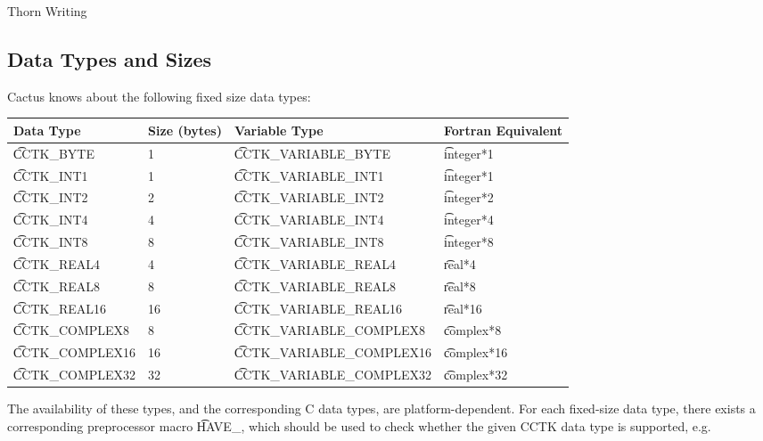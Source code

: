 \begin{cactuspart}{Thorn Writing}
\begin{itemize}
\end{itemize}


\subsection{Data Types and Sizes}
\label{sect-ThornWriting/DataTypes}
\label{sec:datyansi}

Cactus knows about the following fixed size data types:

\begin{center}
\begin{tabular}{|l|l|l|l|}
\hline
Data Type & Size (bytes) & Variable Type & Fortran Equivalent\\
\hline
{\t CCTK\_BYTE}      & 1  & {\t CCTK\_VARIABLE\_BYTE}      & {\t integer*1}\\
{\t CCTK\_INT1}      & 1  & {\t CCTK\_VARIABLE\_INT1}      & {\t integer*1}\\
{\t CCTK\_INT2}      & 2  & {\t CCTK\_VARIABLE\_INT2}      & {\t integer*2}\\
{\t CCTK\_INT4}      & 4  & {\t CCTK\_VARIABLE\_INT4}      & {\t integer*4}\\
{\t CCTK\_INT8}      & 8  & {\t CCTK\_VARIABLE\_INT8}      & {\t integer*8}\\
{\t CCTK\_REAL4}     & 4  & {\t CCTK\_VARIABLE\_REAL4}     & {\t real*4}\\
{\t CCTK\_REAL8}     & 8  & {\t CCTK\_VARIABLE\_REAL8}     & {\t real*8}\\
{\t CCTK\_REAL16}    & 16 & {\t CCTK\_VARIABLE\_REAL16}    & {\t real*16}\\
{\t CCTK\_COMPLEX8}  & 8  & {\t CCTK\_VARIABLE\_COMPLEX8}  & {\t complex*8}\\
{\t CCTK\_COMPLEX16} & 16 & {\t CCTK\_VARIABLE\_COMPLEX16} & {\t complex*16}\\
{\t CCTK\_COMPLEX32} & 32 & {\t CCTK\_VARIABLE\_COMPLEX32} & {\t complex*32}\\
\hline
\end{tabular}
\end{center}

The availability of these types, and the corresponding
C data types, are platform-dependent. For each fixed-size data type, there exists
a corresponding preprocessor macro {\t HAVE\_<data type>}, which should be used
to check whether the given CCTK data type is supported, e.g.\


\end{cactuspart}

